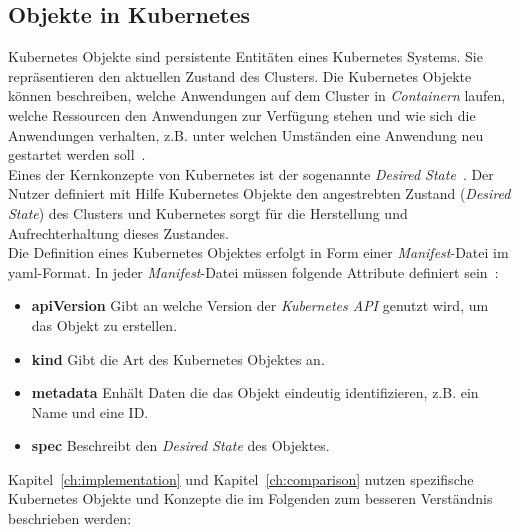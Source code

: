 \subsection{Objekte in Kubernetes}

Kubernetes Objekte sind persistente Entitäten eines Kubernetes Systems. Sie repräsentieren den aktuellen Zustand des Clusters.
Die Kubernetes Objekte können beschreiben, welche Anwendungen auf dem Cluster in \textit{Containern} laufen,
welche Ressourcen den Anwendungen zur Verfügung stehen und
wie sich die Anwendungen verhalten, z.B. unter welchen Umständen eine Anwendung neu gestartet werden soll~\cite{kubernetes-objects}.
\\
Eines der Kernkonzepte von Kubernetes ist der sogenannte \textit{Desired State}~\cite{kubernetes-objects-kodekloud}.
Der Nutzer definiert mit Hilfe Kubernetes Objekte den angestrebten Zustand (\textit{Desired State}) des Clusters und Kubernetes
sorgt für die Herstellung und Aufrechterhaltung dieses Zustandes.
\\
Die Definition eines Kubernetes Objektes erfolgt in Form einer \textit{Manifest}-Datei im \ac{yaml}-Format.
In jeder \textit{Manifest}-Datei müssen folgende Attribute definiert sein~\cite{kubernetes-objects}:

\begin{itemize}
    \setlength\itemsep{-0.5cm}
    \item
          \textbf{apiVersion} Gibt an welche Version der \textit{Kubernetes API} genutzt wird, um das Objekt zu erstellen.
    \item
          \textbf{kind}  Gibt die Art des Kubernetes Objektes an.
    \item
          \textbf{metadata}  Enhält Daten die das Objekt eindeutig identifizieren, z.B. ein Name und eine ID\@.
    \item
          \textbf{spec} Beschreibt den \textit{Desired State} des Objektes.
\end{itemize}

Kapitel~\ref{ch:implementation} und Kapitel~\ref{ch:comparison} nutzen spezifische Kubernetes Objekte und Konzepte die im Folgenden
zum besseren Verständnis beschrieben werden:

